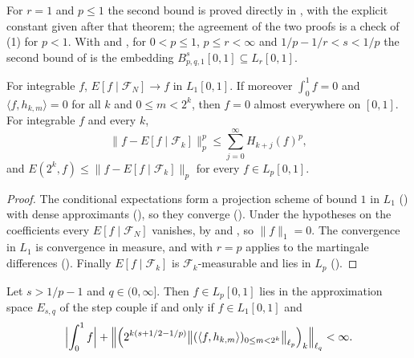 For $r = 1$ and $p \leq 1$ the second bound is proved directly in , with
the explicit constant given after that theorem; the agreement of the two proofs is a check of
(1) for $p < 1$. With  and
, for $0 < p \leq 1$, $p \leq r < \infty$ and $1/p - 1/r < s < 1/p$
the second bound of  is the embedding
$B^s_{p,q,1}[0, 1] \subseteq L_r[0, 1]$.

\begin{lemma}
\label{lem:haar-martingale-l1}
\leanok
{}
For integrable $f$, $E[f \mid \mathcal{F}_N] \to f$ in $L_1[0, 1]$. If moreover $\int_0^1 f = 0$
and $\langle f, h_{k,m} \rangle = 0$ for all $k$ and $0 \leq m < 2^k$, then $f = 0$ almost
everywhere on $[0, 1]$. For integrable $f$ and every $k$,
\[
  \|f - E[f \mid \mathcal{F}_k]\|_p^p \leq \sum_{j=0}^\infty H_{k+j}(f)^p ,
\]
and $E(2^k, f) \leq \|f - E[f \mid \mathcal{F}_k]\|_p$ for every $f \in L_p[0, 1]$.
\end{lemma}

\begin{proof}
\leanok
The conditional expectations form a projection scheme of bound $1$ in $L_1$
() with dense approximants (), so they converge
(). Under the hypotheses on the coefficients every $E[f \mid \mathcal{F}_N]$
vanishes, by  and , so $\|f\|_1 = 0$. The
convergence in $L_1$ is convergence in measure, and  with $r = p$
applies to the martingale differences (). Finally
$E[f \mid \mathcal{F}_k]$ is $\mathcal{F}_k$-measurable and lies in $L_p$
().
\end{proof}

\begin{theorem}
\label{thm:haar-below-one}
\leanok
{}
Let $s > 1/p - 1$ and $q \in (0, \infty]$. Then $f \in L_p[0, 1]$ lies in the approximation space
$E_{s,q}$ of the step couple if and only if $f \in L_1[0, 1]$ and
\[
  \Bigl| \int_0^1 f \Bigr| + \Bigl\| \Bigl(2^{k(s + 1/2 - 1/p)}
  \bigl\| (\langle f, h_{k,m} \rangle)_{0 \leq m < 2^k} \bigr\|_{\ell_p} \Bigr)_k
  \Bigr\|_{\ell_q} < \infty .
\]
\end{theorem}

